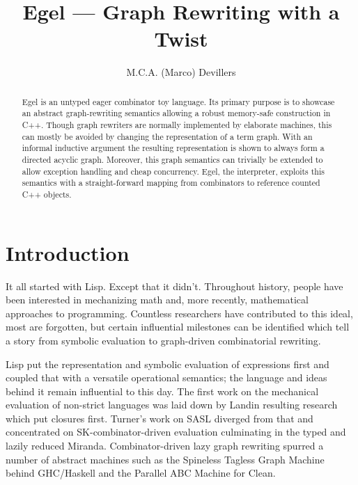 \documentclass{research4cacm}
\begin{document}

\title{Egel --- Graph Rewriting with a Twist}
\author{
\alignauthor
M.C.A. (Marco) Devillers\\
}
\maketitle


\begin{abstract}
Egel is an untyped eager combinator toy language. Its primary purpose 
is to showcase an abstract graph-rewriting semantics allowing a
robust memory-safe construction in C++.
%
Though graph rewriters are normally implemented by elaborate
machines, this can mostly be avoided by changing the representation of 
a term graph. With an informal inductive argument the resulting 
representation is shown to always form a directed acyclic graph.
Moreover, this graph semantics can trivially be extended to allow
exception handling and cheap concurrency.
%
Egel, the interpreter, exploits this semantics with a straight-forward
mapping from combinators to reference counted C++ objects.
\end{abstract}


\section{Introduction}

It all started with Lisp. Except that it didn't. 
Throughout history, people have been interested in mechanizing math and,
more recently, mathematical approaches to programming. Countless
researchers have contributed to this ideal, most are forgotten, but
certain influential milestones can be identified which tell a
story from symbolic evaluation to graph-driven combinatorial
rewriting.

Lisp\cite{mccarthy:lisp1} put the representation and symbolic 
evaluation of expressions first and coupled that with a versatile 
operational semantics; 
the language and ideas behind it remain influential to this day.
The first work on the mechanical evaluation of non-strict languages was
laid down by Landin\cite{landin:secd} resulting research which put
closures first.
Turner's work on SASL\cite{turner:sasl} diverged from that and
concentrated on SK-combinator-driven evaluation culminating in
the typed and lazily reduced Miranda\cite{turner:miranda}.
Combinator-driven lazy graph rewriting spurred a number of 
abstract machines such as the Spineless Tagless Graph Machine\cite{spj:stgm}
behind GHC/Haskell and the Parallel ABC Machine\cite{plasmeijer:clean} for Clean.
\end{document}
